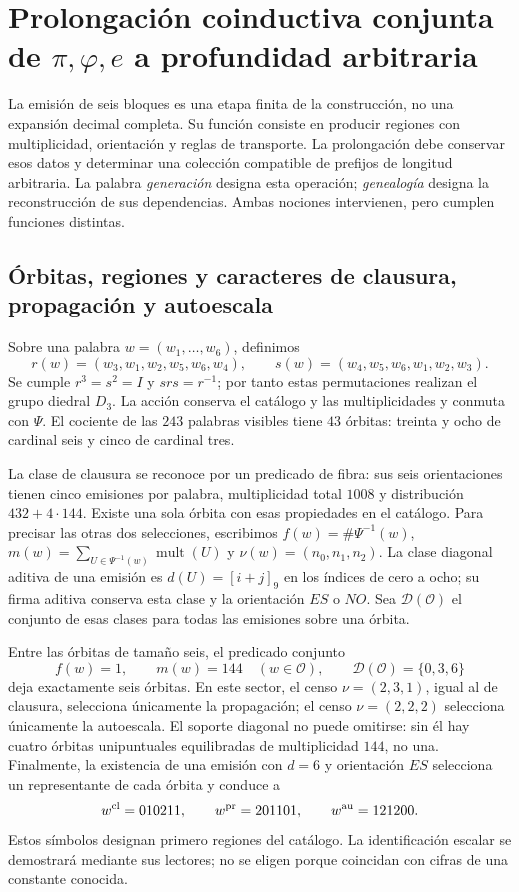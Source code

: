\section{Prolongación coinductiva conjunta de \texorpdfstring{\(\pi,\varphi,e\)}{pi, phi, e} a profundidad arbitraria}
\label{sec:generacion}

La emisión de seis bloques es una etapa finita de la construcción, no una expansión decimal completa. Su función consiste en producir regiones con multiplicidad, orientación y reglas de transporte. La prolongación debe conservar esos datos y determinar una colección compatible de prefijos de longitud arbitraria. La palabra \emph{generación} designa esta operación; \emph{genealogía} designa la reconstrucción de sus dependencias. Ambas nociones intervienen, pero cumplen funciones distintas.

\subsection{Órbitas, regiones y caracteres de clausura, propagación y autoescala}

Sobre una palabra \(w=(w_1,\ldots,w_6)\), definimos
\[
 r(w)=(w_3,w_1,w_2,w_5,w_6,w_4),\qquad
 s(w)=(w_4,w_5,w_6,w_1,w_2,w_3).
\]
Se cumple \(r^3=s^2=I\) y \(srs=r^{-1}\); por tanto estas permutaciones realizan el grupo diedral \(D_3\). La acción conserva el catálogo y las multiplicidades y conmuta con \(\Psi\). El cociente de las \(243\) palabras visibles tiene \(43\) órbitas: treinta y ocho de cardinal seis y cinco de cardinal tres.

La clase de clausura se reconoce por un predicado de fibra: sus seis orientaciones tienen cinco emisiones por palabra, multiplicidad total \(1008\) y distribución \(432+4\cdot144\). Existe una sola órbita con esas propiedades en el catálogo. Para precisar las otras dos selecciones, escribimos \(f(w)=\#\Psi^{-1}(w)\), \(m(w)=\sum_{U\in\Psi^{-1}(w)}\operatorname{mult}(U)\) y \(\nu(w)=(n_0,n_1,n_2)\). La clase diagonal aditiva de una emisión es \(d(U)=[i+j]_9\) en los índices de cero a ocho; su firma aditiva conserva esta clase y la orientación \(ES\) o \(NO\). Sea \(\mathcal D(\mathcal O)\) el conjunto de esas clases para todas las emisiones sobre una órbita.

Entre las órbitas de tamaño seis, el predicado conjunto
\[
 f(w)=1,\qquad m(w)=144\quad(w\in\mathcal O),\qquad
 \mathcal D(\mathcal O)=\{0,3,6\}
\]
deja exactamente seis órbitas. En este sector, el censo \(\nu=(2,3,1)\), igual al de clausura, selecciona únicamente la propagación; el censo \(\nu=(2,2,2)\) selecciona únicamente la autoescala. El soporte diagonal no puede omitirse: sin él hay cuatro órbitas unipuntuales equilibradas de multiplicidad \(144\), no una. Finalmente, la existencia de una emisión con \(d=6\) y orientación \(ES\) selecciona un representante de cada órbita y conduce a
\begin{equation}
 w^{\rm cl}=010211,\qquad w^{\rm pr}=201101,\qquad w^{\rm au}=121200.
 \label{eq:palabras-regionales}
\end{equation}
Estos símbolos designan primero regiones del catálogo. La identificación escalar se demostrará mediante sus lectores; no se eligen porque coincidan con cifras de una constante conocida.

